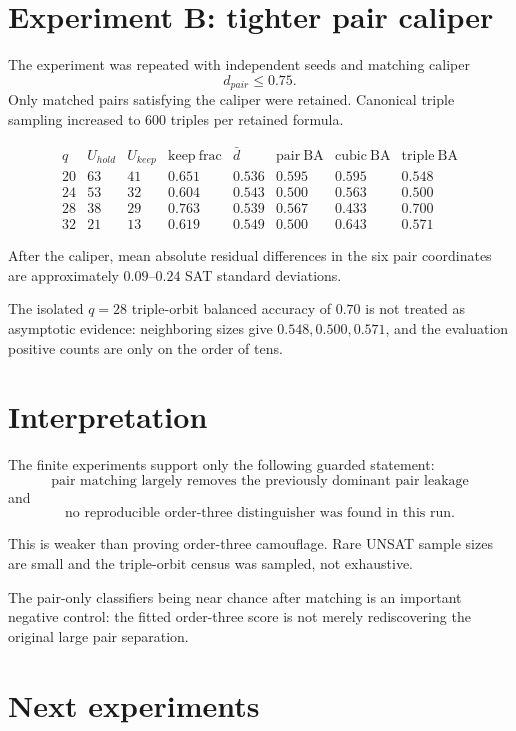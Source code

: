\documentclass[11pt]{article}
\begin{document}
\section{Experiment B: tighter pair caliper}

The experiment was repeated with independent seeds and matching caliper
\[
d_{pair}\le0.75.
\]
Only matched pairs satisfying the caliper were retained. Canonical triple
sampling increased to 600 triples per retained formula.

\[
\begin{array}{c|c|c|c|c|c|c|c}
q&U_{hold}&U_{keep}&\mathrm{keep\ frac}&
\bar d&\mathrm{pair\ BA}&\mathrm{cubic\ BA}&\mathrm{triple\ BA}\\
\hline
20&63&41&0.651&0.536&0.595&0.595&0.548\\
24&53&32&0.604&0.543&0.500&0.563&0.500\\
28&38&29&0.763&0.539&0.567&0.433&0.700\\
32&21&13&0.619&0.549&0.500&0.643&0.571
\end{array}
\]

After the caliper, mean absolute residual differences in the six pair
coordinates are approximately \(0.09\)--\(0.24\) SAT standard deviations.

The isolated \(q=28\) triple-orbit balanced accuracy of \(0.70\) is not
treated as asymptotic evidence: neighboring sizes give \(0.548,0.500,0.571\),
and the evaluation positive counts are only on the order of tens.

\section{Interpretation}

The finite experiments support only the following guarded statement:
\[
\boxed{
\text{pair matching largely removes the previously dominant pair leakage}
}
\]
and
\[
\boxed{
\text{no reproducible order-three distinguisher was found in this run.}
}
\]

This is weaker than proving order-three camouflage. Rare UNSAT sample sizes
are small and the triple-orbit census was sampled, not exhaustive.

The pair-only classifiers being near chance after matching is an important
negative control: the fitted order-three score is not merely rediscovering the
original large pair separation.

\section{Next experiments}
\end{document}
